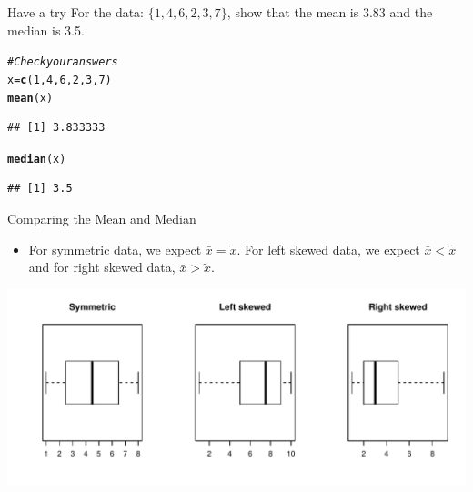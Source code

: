\documentclass[t,xcolor=pdftex,dvipsnames,table]{beamer}\usepackage[]{graphicx}\usepackage[]{color}
\makeatletter
\def\maxwidth{ %
  \ifdim\Gin@nat@width>\linewidth
    \linewidth
  \else
    \Gin@nat@width
  \fi
}
\newcommand{\hlnum}[1]{\textcolor[rgb]{0.686,0.059,0.569}{#1}}%
\newcommand{\hlcom}[1]{\textcolor[rgb]{0.678,0.584,0.686}{\textit{#1}}}%
\newcommand{\hlstd}[1]{\textcolor[rgb]{0.345,0.345,0.345}{#1}}%
\newcommand{\hlkwb}[1]{\textcolor[rgb]{0.69,0.353,0.396}{#1}}%
\newcommand{\hlkwd}[1]{\textcolor[rgb]{0.737,0.353,0.396}{\textbf{#1}}}%
\newenvironment{kframe}{%
 \def\at@end@of@kframe{}%
 \ifinner\ifhmode%
  \def\at@end@of@kframe{\end{minipage}}%
  \begin{minipage}{\columnwidth}%
 \fi\fi%
 \def\FrameCommand##1{\hskip\@totalleftmargin \hskip-\fboxsep
 \colorbox{shadecolor}{##1}\hskip-\fboxsep
     \hskip-\linewidth \hskip-\@totalleftmargin \hskip\columnwidth}%
 \MakeFramed {\advance\hsize-\width
   \@totalleftmargin\z@ \linewidth\hsize
   \@setminipage}}%
 {\par\unskip\endMakeFramed%
 \at@end@of@kframe}
\newenvironment{knitrout}{}{} %
\makeatother
\begin{document}
\begin{frame}[fragile]{}

\vspace{.5cm}
\begin{alertblock}{Have a try}
For the data: $\{ 1,4,6,2,3,7\}$, show that the mean is 3.83 and the median is 3.5. 
\end{alertblock}

\begin{knitrout}
\color{fgcolor}\begin{kframe}
\begin{alltt}
\hlcom{#Check your answers}
\hlstd{x}\hlkwb{=}\hlkwd{c}\hlstd{(}\hlnum{1}\hlstd{,}\hlnum{4}\hlstd{,}\hlnum{6}\hlstd{,}\hlnum{2}\hlstd{,}\hlnum{3}\hlstd{,}\hlnum{7}\hlstd{)}
\hlkwd{mean}\hlstd{(x)}
\end{alltt}
\begin{verbatim}
## [1] 3.833333
\end{verbatim}
\begin{alltt}
\hlkwd{median}\hlstd{(x)}
\end{alltt}
\begin{verbatim}
## [1] 3.5
\end{verbatim}
\end{kframe}
\end{knitrout}

\end{frame}


\begin{frame}{Comparing the Mean and Median}
\begin{itemize}
\item 
For symmetric data, we expect $\bar{x} = \tilde{x}$. For left skewed data, we expect $\bar{x} < \tilde{x}$ and for right skewed data, $\bar{x} > \tilde{x}$.
\end{itemize}

\begin{knitrout}
\color{fgcolor}
\includegraphics[width=\maxwidth]{figure/unnamed-chunk-28-1} 

\end{knitrout}
\end{frame}
\end{document}
